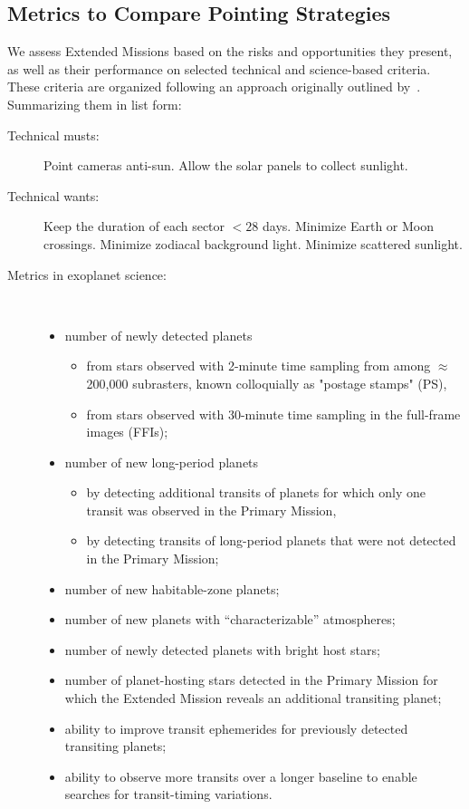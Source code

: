 \subsection{Metrics to Compare Pointing Strategies}
\label{sec:comparing_pointing_strategies}

We assess Extended Missions based on the risks and opportunities they
present, as well as their performance on selected technical and
science-based criteria.  These criteria are organized following an
approach originally outlined by~\citet{kepner_rational_1965}.
Summarizing them in list form:
\begin{description}
\item[Technical musts:] Point cameras anti-sun. Allow the solar panels to collect sunlight.
\item[Technical wants:] Keep the duration of each sector $<28$ days. Minimize Earth or Moon 
crossings. Minimize zodiacal background light. Minimize scattered sunlight.
\item[Metrics in exoplanet science:]\
	\begin{itemize}
	\item number of newly detected planets
	\begin{itemize}
	  \item from stars observed with 2-minute time sampling from among $\approx$200,000 subrasters, known colloquially as "postage stamps" (PS),
	  \item from stars observed with 30-minute time sampling in the full-frame images (FFIs);
	\end{itemize}
	\item number of new long-period planets 
	\begin{itemize} 
          \item by detecting additional transits of planets for which only one transit was observed in the Primary Mission,
	  \item by detecting transits of long-period planets that were not detected in the Primary Mission;
	 \end{itemize}
	\item number of new habitable-zone planets; 
	\item number of new planets with ``characterizable'' atmospheres; 
	\item number of newly detected planets with bright host stars; 
	\item number of planet-hosting stars detected in the Primary Mission for which the Extended Mission reveals an additional transiting planet;
        \item ability to improve transit ephemerides for previously detected transiting planets;
	\item ability to observe more transits over a longer baseline to enable searches for transit-timing variations.
        \end{itemize}
\end{description}

